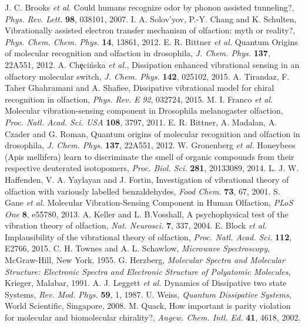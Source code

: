 \documentclass[aps,prl,tightenlines,onecolumn,superscriptaddress]{revtex4}
\begin{document}
\begin{thebibliography}{1}
 J. C. Brooks {\it et al.} Could humans recognize odor by phonon assisted tunneling?, {\it Phys. Rev. Lett.} {\bf 98}, 038101, 2007.
 I. A. Solov'yov, P.-Y. Chang and K. Schulten, Vibrationally assisted electron transfer mechanism of olfaction: myth or reality?, {\it Phys. Chem. Chem. Phys.} {\bf 14}, 13861, 2012.
 E. R. Bittner {\it et al.} Quantum Origins of molecular recognition and olfaction in drosophila, {\it J. Chem. Phys.} {\bf 137}, 22A551, 2012.
 A. Ch\c{e}ci\'{n}ska {\it et al.}, Dissipation enhanced vibrational sensing in an olfactory molecular switch, {\it J. Chem. Phys.} {\bf 142}, 025102, 2015.
 A. Tirandaz, F. Taher Ghahramani and A. Shafiee, Dissipative vibrational model for chiral recognition in olfaction, {\it Phys. Rev. E} {\it 92}, 032724, 2015.
 M. I. Franco {\it et al.} Molecular vibration-sensing component in Drosophila melanogaster olfaction, {\it Proc. Natl. Acad. Sci. USA} {\bf 108}, 3797, 2011.
 E. R. Bittner, A. Madalan, A. Czader and G. Roman, Quantum origins of molecular recognition and olfaction in drosophila, {\it J. Chem. Phys.} {\bf 137}, 22A551, 2012.
 W. Gronenberg {\it et al.} Honeybees (Apis mellifera) learn to discriminate the smell of organic compounds from their respective deuterated isotopomers, {\it Proc. Biol. Sci.} {\bf 281}, 20133089, 2014.
 L. J. W. Haffenden, V. A. Yaylayan and J. Fortin, Investigation of vibrational theory of olfaction with variously labelled benzaldehydes, {\it Food Chem.} {\bf 73}, 67, 2001.
 S. Gane {\it et al.} Molecular Vibration-Sensing Component in Human Olfaction, {\it PLoS One} {\bf 8}, e55780, 2013.
 A. Keller and L. B.Vosshall, A psychophysical test of the vibration theory of olfaction, {\it Nat. Neurosci.} {\bf 7}, 337, 2004.
 E. Block {\it et al.} Implausibility of the vibrational theory of olfaction, {\it Proc. Natl. Acad. Sci.} {\bf 112}, E2766, 2015.
 C. H. Townes and A. L. Schawlow, {\it Microwave Spectroscopy}, McGraw-Hill, New York, 1955.
 G. Herzberg, {\it Molecular Spectra and Molecular Structure: Electronic Spectra and Electronic Structure of Polyatomic Molecules}, Krieger, Malabar, 1991.
 A. J. Leggett {\it et al.} Dynamics of Dissipative two state Systems, {\it Rev. Mod. Phys.} {\bf 59}, 1, 1987.
 U. Weiss, {\it Quantum Dissipative Systems}, World Scientific, Singapore, 2008.
 M. Quack, How important is parity violation for molecular and biomolecular chirality?, {\it Angew. Chem. Intl. Ed.} {\bf 41}, 4618, 2002.

\end{thebibliography}
\end{document}
